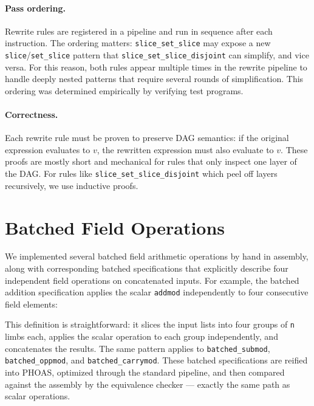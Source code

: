 \paragraph{Pass ordering.}
Rewrite rules are registered in a pipeline and run in sequence after each instruction.
The ordering matters: \texttt{slice\_set\_slice} may expose a new \texttt{slice}/\texttt{set\_slice} pattern that \texttt{slice\_set\_slice\_disjoint} can simplify, and vice versa.
For this reason, both rules appear multiple times in the rewrite pipeline to handle deeply nested patterns that require several rounds of simplification. This ordering was determined empirically by verifying test programs.

\paragraph{Correctness.}
Each rewrite rule must be proven to preserve DAG semantics: if the original expression evaluates to $v$, the rewritten expression must also evaluate to $v$.
These proofs are mostly short and mechanical for rules that only inspect one layer of the DAG. For rules like \texttt{slice\_set\_slice\_disjoint} which peel off layers recursively, we use inductive proofs.


\section{Batched Field Operations}
\label{sec:batched}

We implemented several batched field arithmetic operations by hand in assembly, along with corresponding batched specifications that explicitly describe four independent field operations on concatenated inputs.
For example, the batched addition specification applies the scalar \texttt{addmod} independently to four consecutive field elements:


This definition is straightforward: it slices the input lists into four groups of \texttt{n} limbs each, applies the scalar operation to each group independently, and concatenates the results.
The same pattern applies to \texttt{batched_submod}, \texttt{batched_oppmod}, and \texttt{batched_carrymod}.
These batched specifications are reified into PHOAS, optimized through the standard pipeline, and then compared against the assembly by the equivalence checker --- exactly the same path as scalar operations.

